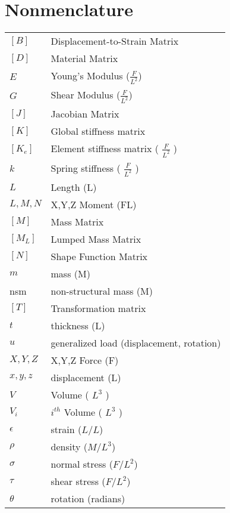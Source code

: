 \section{Nonmenclature}

\begin{tabular}{ll}
    $[B]$      & Displacement-to-Strain Matrix        \\
    $[D]$      & Material Matrix                      \\
    $E$        & Young's Modulus ($\frac{F}{L^2}$)    \\
    $G$        & Shear Modulus ($\frac{F}{L^2}$)      \\
    $[J]$      & Jacobian Matrix                      \\
    $[K]$      & Global stiffness matrix              \\
    $[K_e]$    & Element stiffness matrix ( $\frac{F}{L^2}$ ) \\
    $k$        & Spring stiffness ( $\frac{F}{L^2}$ ) \\
    $L$        & Length (L)                           \\
    $L,M,N$    & X,Y,Z Moment (FL)                    \\
    $[M]$      & Mass Matrix                          \\
    $[M_L]$    & Lumped Mass Matrix                   \\
    $[N]$      & Shape Function Matrix                \\
    $m$        & mass (M)                             \\
    nsm        & non-structural mass (M)              \\
    $[T]$      & Transformation matrix                \\
    $t$        & thickness (L)                        \\
    $u$        & generalized load (displacement, rotation) \\
    $X,Y,Z$    & X,Y,Z Force (F)                      \\
    $x,y,z$    & displacement (L)                     \\
    $V$        & Volume  ( $L^3$ )                    \\
    $V_i$      & $i^{th}$ Volume  ( $L^3$ )                \\
    $\epsilon$ & strain ($L/L$)                       \\
    $\rho$     & density ($M/L^3$)                    \\
    $\sigma$   & normal stress ($F/L^2$)              \\
    $\tau$     & shear  stress ($F/L^2$)              \\
    $\theta$   & rotation (radians)
\end {tabular}
